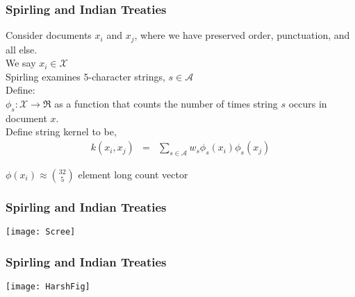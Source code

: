 \begin{frame}[fragile]
\frametitle{Spirling and Indian Treaties}

Consider documents ${x}_{i}$ and ${x}_{j}$, where we have preserved order, punctuation, and all else.  \\
We say ${x}_{i} \in \mathcal{X}$  \\
Spirling examines $5$-character strings, $s \in \mathcal{A}$  \\
Define:  \\
$\phi_{s}:\mathcal{X}\rightarrow\Re$ as a function that counts the number of times string $s$ occurs in document ${x}$.\\ 

Define \alert{string kernel} to be, 
\begin{eqnarray}
k({x}_{i}, {x}_{j} ) & = & \sum_{s \in \mathcal{A}} w_{s} \phi_{s}({x}_{i})\phi_{s}({x}_{j}) \nonumber 
\end{eqnarray}

${\phi}({x}_{i}) \approx {{32}\choose{5}}$ element long count vector


\end{frame}

\begin{frame}[fragile]
\frametitle{Spirling and Indian Treaties}

\begin{center}
\texttt{[image: Scree]}
\end{center}


\end{frame}

\begin{frame}[fragile]
\frametitle{Spirling and Indian Treaties}

\begin{center}
\texttt{[image: HarshFig]}
\end{center}


\end{frame}



